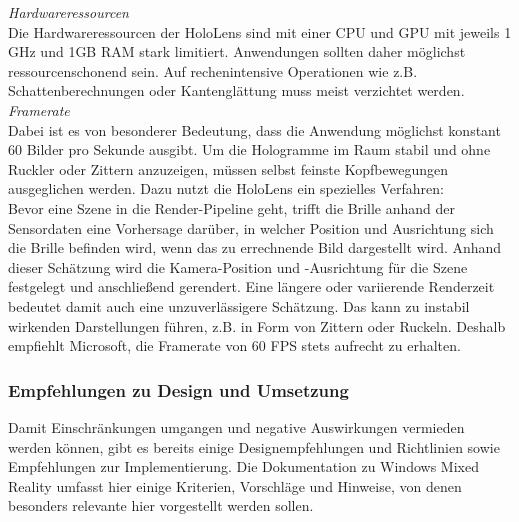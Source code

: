 \textit{Hardwareressourcen}\\
Die Hardwareressourcen der HoloLens sind mit einer CPU und GPU mit jeweils 1 GHz und 1GB RAM stark limitiert. Anwendungen sollten daher möglichst ressourcenschonend sein. Auf rechenintensive Operationen wie z.B. Schattenberechnungen oder Kantenglättung muss meist verzichtet werden.\\

\textit{Framerate}\\
Dabei ist es von besonderer Bedeutung, dass die Anwendung möglichst konstant 60 Bilder pro Sekunde ausgibt. Um die Hologramme im Raum stabil und ohne Ruckler oder Zittern anzuzeigen, müssen selbst feinste Kopfbewegungen ausgeglichen werden. Dazu nutzt die HoloLens ein spezielles Verfahren:\\
\noindent\hspace*{5mm}
Bevor eine Szene in die Render-Pipeline geht, trifft die Brille anhand der Sensordaten eine Vorhersage darüber, in welcher Position und Ausrichtung sich die Brille befinden wird, wenn das zu errechnende Bild dargestellt wird. Anhand dieser Schätzung wird die Kamera-Position und -Ausrichtung für die Szene festgelegt und anschließend gerendert. Eine längere oder variierende Renderzeit bedeutet damit auch eine unzuverlässigere Schätzung. Das kann zu instabil wirkenden Darstellungen führen, z.B. in Form von Zittern oder Ruckeln. Deshalb empfiehlt Microsoft, die Framerate von 60 FPS stets aufrecht zu erhalten.

\subsubsection{Empfehlungen zu Design und Umsetzung}
\label{sec-2-1-5}
Damit Einschränkungen umgangen und negative Auswirkungen vermieden werden können, gibt es bereits einige Designempfehlungen und Richtlinien sowie Empfehlungen zur Implementierung. Die Dokumentation zu Windows Mixed Reality umfasst hier einige Kriterien, Vorschläge und Hinweise, von denen besonders relevante hier vorgestellt werden sollen.\\

